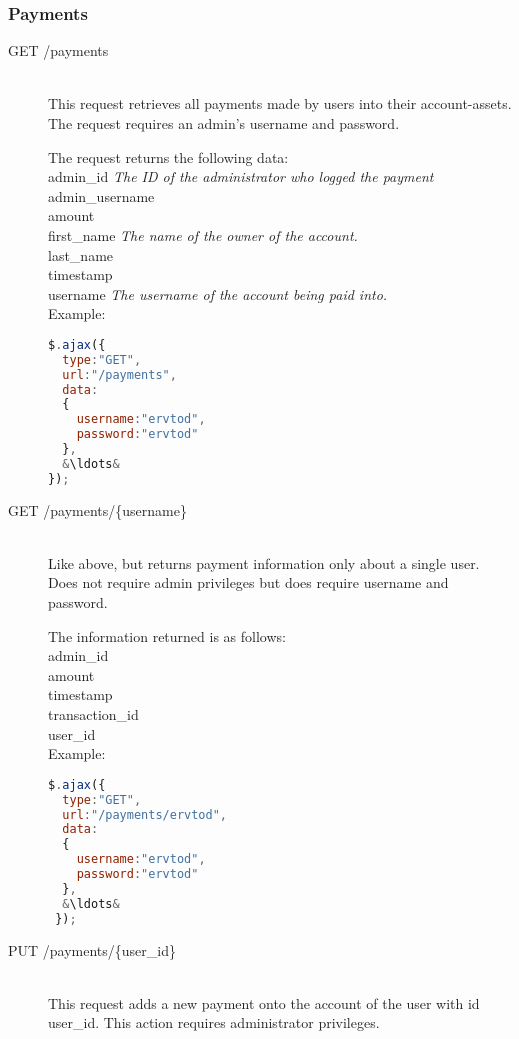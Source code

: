 \documentclass[a4paper]{article}
\begin{document}
\subsubsection{Payments}
\begin{description}
  \item[GET /payments]\hfill\\
    This request retrieves all payments made by users into their account-assets.
    The request requires an admin's username and password.
    
    The request returns the following data:\hfill\\
    admin\_id \textit{The ID of the administrator who logged the payment}\hfill\\
    admin\_username\hfill\\
    amount\hfill\\
    first\_name \textit{The name of the owner of the account.}\hfill\\
    last\_name \hfill\\
    timestamp \hfill\\
    username \textit{The username of the account being paid into.}\hfill\\

    Example:\hfill\\
    \begin{lstlisting}[language=javascript, frame=single, showstringspaces = false, basicstyle=\small\ttfamily, escapechar=\&]
$.ajax({
  type:"GET",
  url:"/payments",
  data:
  {
    username:"ervtod",
    password:"ervtod"
  },
  &\ldots&
});
    \end{lstlisting}
    \item[GET /payments/\{username\}]\hfill\\
      Like above, but returns payment information only about a single user.
      Does not require admin privileges but does require username and password.
      
      The information returned is as follows:\hfill\\
      admin\_id\hfill\\
      amount\hfill\\
      timestamp\hfill\\
      transaction\_id\hfill\\
      user\_id\hfill\\
  Example:\hfill\\
  \begin{lstlisting}[language=javascript, frame=single, showstringspaces = false, basicstyle=\small\ttfamily, escapechar=\&]
$.ajax({
  type:"GET",
  url:"/payments/ervtod",
  data:
  {
    username:"ervtod",
    password:"ervtod"
  },
  &\ldots&
 });
  \end{lstlisting}     
  \item[PUT /payments/\{user\_id\}]\hfill\\
    This request adds a new payment onto the account of the user with id user\_id.
    This action requires administrator privileges.
    

\end{description}
\end{document}
